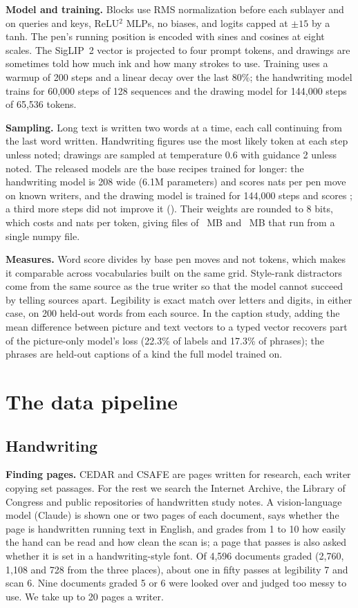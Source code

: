 \documentclass{article}
\begin{document}
\textbf{Model and training.} Blocks use RMS normalization before each sublayer and on queries and keys, ReLU$^2$ MLPs, no biases, and logits capped at $\pm15$ by a tanh. The pen's running position is encoded with sines and cosines at eight scales. The SigLIP~2 vector is projected to four prompt tokens, and drawings are sometimes told how much ink and how many strokes to use. Training uses a warmup of 200 steps and a linear decay over the last 80\%; the handwriting model trains for 60,000 steps of 128 sequences and the drawing model for 144,000 steps of 65,536 tokens.

\textbf{Sampling.} Long text is written two words at a time, each call continuing from the last word written. Handwriting figures use the most likely token at each step unless noted; drawings are sampled at temperature $0.6$ with guidance 2 unless noted. The released models are the base recipes trained for longer: the handwriting model is 208 wide (6.1M parameters) and scores \FinalHandScore{} nats per pen move on known writers, and the drawing model is trained for 144,000 steps and scores \FinalSketchScore{}; a third more steps did not improve it (\LongerSketchScore). Their weights are rounded to 8 bits, which costs \FinalHandCost{} and \FinalSketchCost{} nats per token, giving files of \FinalHandSize{}~MB and \FinalSketchSize{}~MB that run from a single numpy file.

\textbf{Measures.} Word score divides by base pen moves and not tokens, which makes it comparable across vocabularies built on the same grid. Style-rank distractors come from the same source as the true writer so that the model cannot succeed by telling sources apart. Legibility is exact match over letters and digits, in either case, on 200 held-out words from each source. In the caption study, adding the mean difference between picture and text vectors to a typed vector recovers part of the picture-only model's loss (22.3\% of labels and 17.3\% of phrases); the phrases are held-out captions of a kind the full model trained on.


\section{The data pipeline}
\label{app:pipeline}

\subsection{Handwriting}

\textbf{Finding pages.} CEDAR and CSAFE are pages written for research, each writer copying set passages. For the rest we search the Internet Archive, the Library of Congress and public repositories of handwritten study notes. A vision-language model (Claude) is shown one or two pages of each document, says whether the page is handwritten running text in English, and grades from 1 to 10 how easily the hand can be read and how clean the scan is; a page that passes is also asked whether it is set in a handwriting-style font. Of 4,596 documents graded (2,760, 1,108 and 728 from the three places), about one in fifty passes at legibility 7 and scan 6. Nine documents graded 5 or 6 were looked over and judged too messy to use. We take up to 20 pages a writer.
\end{document}
